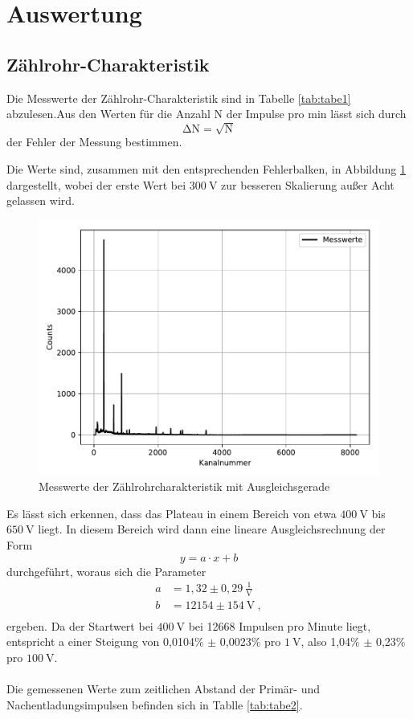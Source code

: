 \section{Auswertung}
\subsection{Zählrohr-Charakteristik}
Die Messwerte der Zählrohr-Charakteristik sind in Tabelle \ref{tab:tabe1}
abzulesen.Aus den Werten für die Anzahl N der Impulse pro min lässt sich durch
\begin{equation}
  \increment\text{N}=\sqrt{\text{N}}
\end{equation}
der Fehler der Messung bestimmen.

Die Werte sind, zusammen mit den entsprechenden Fehlerbalken, in Abbildung \ref{fig:plot1}
dargestellt, wobei der erste Wert bei $\SI{300}{\volt}$ zur besseren Skalierung
außer Acht gelassen wird.
\begin{figure}[H]
  \centering
  \includegraphics{plot1.pdf}
  \caption{Messwerte der Zählrohrcharakteristik mit Ausgleichsgerade}
  \label{fig:plot1}
\end{figure}
Es lässt sich erkennen, dass das Plateau in einem Bereich von etwa $\SI{400}{\volt}$
bis $\SI{650}{\volt}$ liegt. In diesem Bereich wird dann eine lineare Ausgleichsrechnung
der Form
\begin{equation}
  y = a\cdot x +b
  \label{eqn:linear}
\end{equation}
durchgeführt, woraus sich die Parameter
\begin{align*}
  a &= 1,32 \pm 0,29 \: \frac{1}{\text{V}}\\
  b &= 12154 \pm 154 \: \text{V}\: ,\\
\end{align*}
ergeben.
Da der Startwert bei $\SI{400}{\volt}$ bei 12668 Impulsen pro Minute liegt,
entspricht a einer Steigung von 0,0104\% $\pm$ 0,0023\% pro $\SI{1}{\volt}$,
also 1,04\% $\pm$ 0,23\% pro $\SI{100}{\volt}$. \\
\\
Die gemessenen Werte zum zeitlichen Abstand der Primär- und Nachentladungsimpulsen
befinden sich in Tablle \ref{tab:tabe2}.


